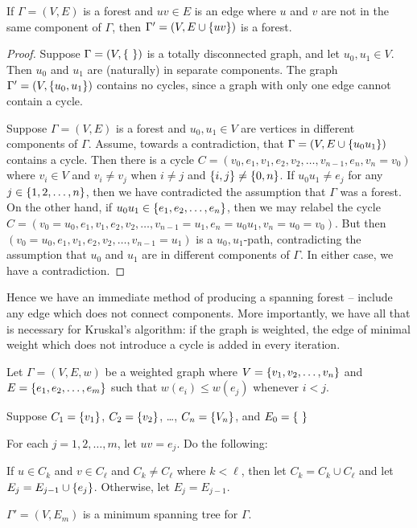 \documentclass[m3380-lec-main.tex]{subfiles}
\begin{document}
\begin{thm} If $\Gamma=(V,E)$ is a forest and $uv\in E$ is an edge where $u$ and $v$ are not in the same component of $\Gamma$, then $\Gamma'=(V,E\cup\left\{uv\right\})$ is a forest.
\end{thm}
\begin{proof}
Suppose $\Gamma=(V,\left\{~\right\})$ is a totally disconnected graph, and let $u_0,u_1\in V$. Then $u_0$ and $u_1$ are (naturally) in separate components. The graph $\Gamma'=(V,\left\{u_0,u_1\right\})$ contains no cycles, since a graph with only one edge cannot contain a cycle.

Suppose $\Gamma=(V,E)$ is a forest and $u_0,u_1\in V$ are vertices in different components of $\Gamma$. Assume, towards a contradiction, that $\Gamma=(V,E\cup\left\{u_0u_1\right\})$ contains a cycle. Then there is a cycle  $C=(v_0,e_1,v_1,e_2,v_2,\ldots,v_{n-1},e_n,v_n=v_0)$ where $v_i\in V$ and $v_i\neq v_j$ when $i\neq j$ and $\left\{i,j\right\}\neq\left\{0,n\right\}$. If $u_0u_1\neq e_j$ for any $j\in\left\{1,2,\ldots,n\right\}$, then we have contradicted the assumption that $\Gamma$ was a forest. On the other hand, if $u_0u_1\in \left\{e_1,e_2,\ldots,e_n\right\}$, then we may relabel the cycle $C=(v_0=u_0, e_1, v_1, e_2, v_2, \ldots, v_{n-1}=u_1, e_n=u_0u_1, v_n=u_0=v_0)$. But then $(v_0=u_0, e_1, v_1, e_2, v_2, \ldots, v_{n-1}=u_1)$ is a $u_0,u_1$-path, contradicting the assumption that $u_0$ and $u_1$ are in different components of $\Gamma$. In either case, we have a contradiction. 
\end{proof}

Hence we have an immediate method of producing a spanning forest -- include any edge which does not connect components. More importantly, we have all that is necessary for Kruskal's algorithm: if the graph is weighted, the edge of minimal weight which does not introduce a cycle is added in every iteration.

\begin{alg}
Let ${\Gamma=(V,E,w)}$ be a weighted graph where $V=\left\{v_1,v_2,\ldots,v_n\right\}$ and $E=\left\{e_1,e_2,\ldots, e_m\right\}$ such that $w(e_i)\leq w(e_j)$ whenever $i<j$.
\begin{enum}
\item Suppose $C_1 = \left\{v_1\right\}$, $C_2=\left\{v_2\right\}$, \ldots, $C_n=\left\{V_n\right\}$, and $E_0= \left\{~\right\}$
\item For each $j=1,2,\ldots,m$, let $uv=e_j$. Do the following:
\begin{enuma}
\item If $u\in C_k$ and $v\in C_\ell$ and $C_k\neq C_\ell$ where $k<\ell$, then let $C_k = C_k\cup C_\ell$ and let $E_{j} = E_{j-1}\cup\left\{e_j\right\}$. Otherwise, let $E_{j} = E_{j-1}$.
\end{enuma}
\item $\Gamma' = (V,E_m)$ is a minimum spanning tree for $\Gamma$.
\end{enum}
\end{alg}
\end{document}
